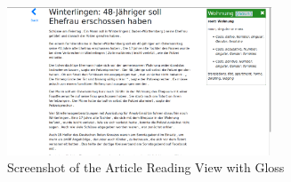 \begin{figure}
	\caption{Screenshot of the Article Reading View with Gloss}
	\label{fig:view4}
	\begin{center}
	\includegraphics[width=0.7\textwidth]{Graphics/View4}
\end{center}
\end{figure}